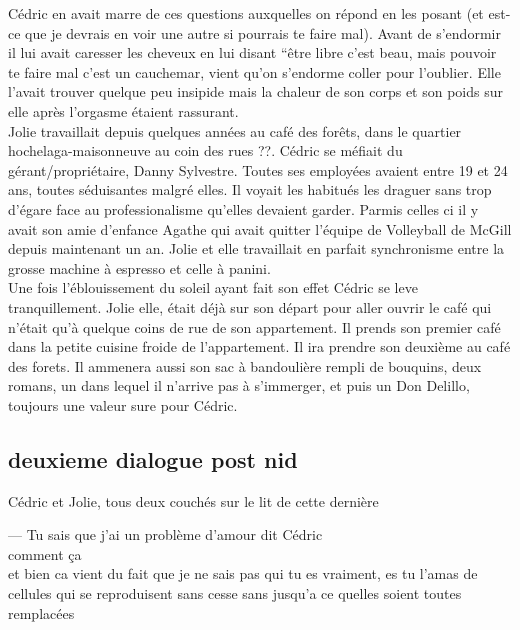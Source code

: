 \documentclass{article}
\begin{document}
Cédric en avait marre de ces questions auxquelles on répond en les posant (et
est-ce que je devrais en voir une autre si pourrais te faire mal). Avant de
s'endormir il lui avait caresser les cheveux en lui disant ``être libre c'est
beau, mais pouvoir te faire mal c'est un cauchemar, vient qu'on s'endorme coller
pour l'oublier. Elle l'avait trouver quelque peu insipide mais la chaleur de son
corps et son poids sur elle après l'orgasme étaient rassurant. \\

Jolie travaillait depuis quelques années au café des forêts, dans le quartier
hochelaga-maisonneuve au coin des rues ??. Cédric se méfiait du
gérant/propriétaire, Danny Sylvestre. Toutes ses employées avaient entre 19 et
24 ans, toutes séduisantes malgré elles. Il voyait les habitués les draguer sans
trop d'égare face au professionalisme qu'elles devaient garder. Parmis celles ci
il y avait son amie d'enfance Agathe qui avait quitter l'équipe de Volleyball de
McGill depuis maintenant un an. Jolie et elle travaillait en parfait synchronisme entre
la grosse machine à espresso et celle à panini.\\

Une fois l'éblouissement du soleil ayant fait son effet Cédric se leve
tranquillement. Jolie elle, était déjà sur son départ pour aller ouvrir le café
qui n'était qu'à quelque coins de rue de son appartement. Il prends son premier
café dans la petite cuisine froide de l'appartement. Il ira prendre son deuxième
au café des forets. Il ammenera aussi son sac à bandoulière rempli de bouquins,
deux romans, un dans lequel il n'arrive pas à s'immerger, et puis un Don
Delillo, toujours une valeur sure pour Cédric.\\


\clearpage



\subsection{deuxieme dialogue post nid}
Cédric et Jolie, tous deux couchés sur le lit de cette dernière

--- Tu sais que j'ai un problème d'amour dit Cédric\\

comment ça\\

et bien ca vient  du fait que je ne sais pas qui tu es vraiment, es
tu l'amas de cellules qui se reproduisent sans cesse sans jusqu'a ce quelles
soient toutes remplacées\\
\end{document}
